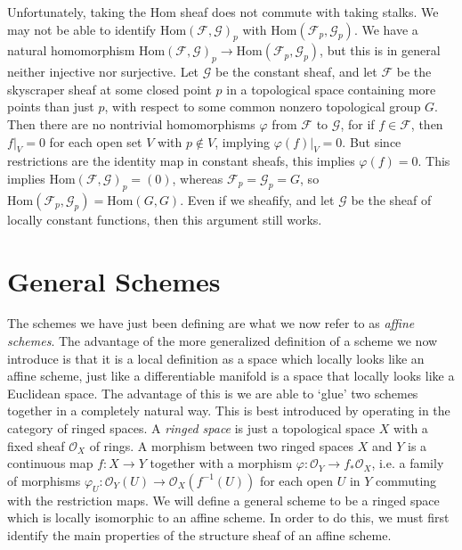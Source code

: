 \begin{example}
    Unfortunately, taking the Hom sheaf does not commute with taking stalks. We may not be able to identify $\text{Hom}(\mathcal{F},\mathcal{G})_p$ with $\text{Hom}(\mathcal{F}_p, \mathcal{G}_p)$. We have a natural homomorphism $\text{Hom}(\mathcal{F},\mathcal{G})_p \to \text{Hom}(\mathcal{F}_p, \mathcal{G}_p)$, but this is in general neither injective nor surjective. Let $\mathcal{G}$ be the constant sheaf, and let $\mathcal{F}$ be the skyscraper sheaf at some closed point $p$ in a topological space containing more points than just $p$, with respect to some common nonzero topological group $G$. Then there are no nontrivial homomorphisms $\varphi$ from $\mathcal{F}$ to $\mathcal{G}$, for if $f \in \mathcal{F}$, then $f|_V = 0$ for each open set $V$ with $p \not \in V$, implying $\varphi(f)|_V = 0$. But since restrictions are the identity map in constant sheafs, this implies $\varphi(f) = 0$. This implies $\text{Hom}(\mathcal{F},\mathcal{G})_p = (0)$, whereas $\mathcal{F}_p = \mathcal{G}_p = G$, so $\text{Hom}(\mathcal{F}_p, \mathcal{G}_p) = \text{Hom}(G,G)$. Even if we sheafify, and let $\mathcal{G}$ be the sheaf of locally constant functions, then this argument still works.
\end{example}

\section{General Schemes}

The schemes we have just been defining are what we now refer to as {\it affine schemes}. The advantage of the more generalized definition of a scheme we now introduce is that it is a local definition as a space which locally looks like an affine scheme, just like a differentiable manifold is a space that locally looks like a Euclidean space. The advantage of this is we are able to `glue' two schemes together in a completely natural way. This is best introduced by operating in the category of ringed spaces. A {\it ringed space} is just a topological space $X$ with a fixed sheaf $\mathcal{O}_X$ of rings. A morphism between two ringed spaces $X$ and $Y$ is a continuous map $f: X \to Y$ together with a morphism $\varphi: \mathcal{O}_Y \to f_* \mathcal{O}_X$, i.e. a family of morphisms $\varphi_U: \mathcal{O}_Y(U) \to \mathcal{O}_X(f^{-1}(U))$ for each open $U$ in $Y$ commuting with the restriction maps. We will define a general scheme to be a ringed space which is locally isomorphic to an affine scheme. In order to do this, we must first identify the main properties of the structure sheaf of an affine scheme.

